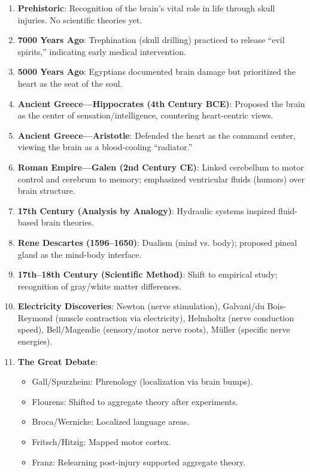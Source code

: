 \begin{enumerate}
    \item \textbf{Prehistoric}: Recognition of the brain's vital role in life through skull injuries. No scientific theories yet.
    
    \item \textbf{7000 Years Ago}: Trephination (skull drilling) practiced to release ``evil spirits,'' indicating early medical intervention.
    
    \item \textbf{5000 Years Ago}: Egyptians documented brain damage but prioritized the heart as the seat of the soul.
    
    \item \textbf{Ancient Greece—Hippocrates (4th Century BCE)}: Proposed the brain as the center of sensation/intelligence, countering heart-centric views.
    
    \item \textbf{Ancient Greece—Aristotle}: Defended the heart as the command center, viewing the brain as a blood-cooling ``radiator.''
    
    \item \textbf{Roman Empire—Galen (2nd Century CE)}: Linked cerebellum to motor control and cerebrum to memory; emphasized ventricular fluids (humors) over brain structure.
    
    \item \textbf{17th Century (Analysis by Analogy)}: Hydraulic systems inspired fluid-based brain theories.
    
    \item \textbf{Rene Descartes (1596–1650)}: Dualism (mind vs. body); proposed pineal gland as the mind-body interface.
    
    \item \textbf{17th–18th Century (Scientific Method)}: Shift to empirical study; recognition of gray/white matter differences.
    
    \item \textbf{Electricity Discoveries}: Newton (nerve stimulation), Galvani/du Bois-Reymond (muscle contraction via electricity), Helmholtz (nerve conduction speed), Bell/Magendie (sensory/motor nerve roots), Müller (specific nerve energies).
    
    \item \textbf{The Great Debate}:
        \begin{itemize}
            \item Gall/Spurzheim: Phrenology (localization via brain bumps).
            \item Flourens: Shifted to aggregate theory after experiments.
            \item Broca/Wernicke: Localized language areas.
            \item Fritsch/Hitzig: Mapped motor cortex.
            \item Franz: Relearning post-injury supported aggregate theory.
        \end{itemize}
    

\end{enumerate}
